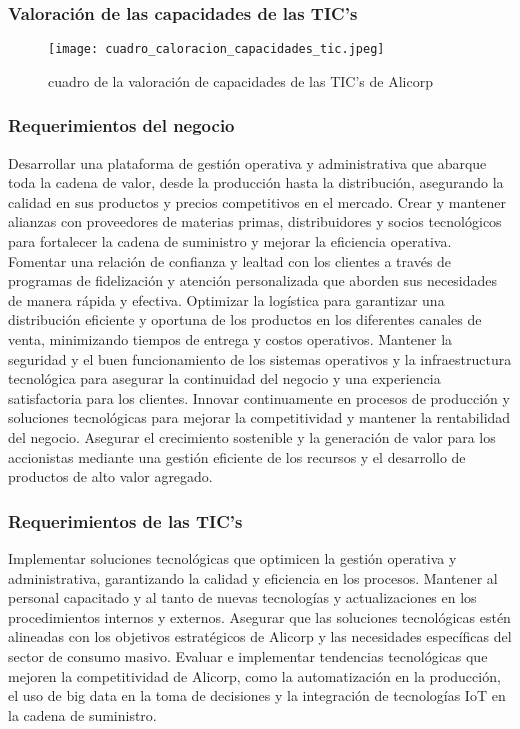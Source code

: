     \subsubsection{Valoración de las capacidades de las TIC’s }
    \begin{figure}[!ht]
        \centering
        \texttt{[image: cuadro\_caloracion\_capacidades\_tic.jpeg]}
        \caption{cuadro de la valoración de capacidades de las TIC's de Alicorp}
    \end{figure}

    \subsubsection{Requerimientos del negocio}
    Desarrollar una plataforma de gestión operativa y administrativa que abarque toda la cadena de valor, desde la producción hasta la distribución, asegurando la calidad en sus productos y precios competitivos en el mercado. 
    Crear y mantener alianzas con proveedores de materias primas, distribuidores y socios tecnológicos para fortalecer la cadena de suministro y mejorar la eficiencia operativa. 
    Fomentar una relación de confianza y lealtad con los clientes a través de programas de fidelización y atención personalizada que aborden sus necesidades de manera rápida y efectiva. 
    Optimizar la logística para garantizar una distribución eficiente y oportuna de los productos en los diferentes canales de venta, minimizando tiempos de entrega y costos operativos. 
    Mantener la seguridad y el buen funcionamiento de los sistemas operativos y la infraestructura tecnológica para asegurar la continuidad del negocio y una experiencia satisfactoria para los clientes. 
    Innovar continuamente en procesos de producción y soluciones tecnológicas para mejorar la competitividad y mantener la rentabilidad del negocio. 
    Asegurar el crecimiento sostenible y la generación de valor para los accionistas mediante una gestión eficiente de los recursos y el desarrollo de productos de alto valor agregado. 

    \subsubsection{Requerimientos de las TIC’s}
    Implementar soluciones tecnológicas que optimicen la gestión operativa y administrativa, garantizando la calidad y eficiencia en los procesos. 
    Mantener al personal capacitado y al tanto de nuevas tecnologías y actualizaciones en los procedimientos internos y externos. 
    Asegurar que las soluciones tecnológicas estén alineadas con los objetivos estratégicos de Alicorp y las necesidades específicas del sector de consumo masivo. 
    Evaluar e implementar tendencias tecnológicas que mejoren la competitividad de Alicorp, como la automatización en la producción, el uso de big data en la toma de decisiones y la integración de tecnologías IoT en la cadena de suministro. 
    
